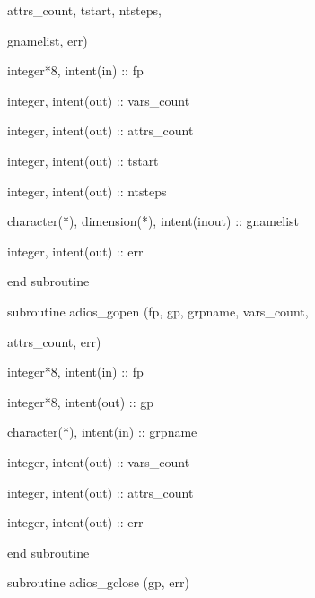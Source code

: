 \vspace{10pt}
\parindent=97pt
attrs\_count, tstart, ntsteps, 

\vspace{10pt}
gnamelist, err)

\vspace{10pt}
\parindent=36pt
integer*8,      intent(in)  :: fp

\vspace{10pt}
integer,        intent(out) :: vars\_count

\vspace{10pt}
integer,        intent(out) :: attrs\_count

\vspace{10pt}
integer,        intent(out) :: tstart

\vspace{10pt}
integer,        intent(out) :: ntsteps

\vspace{10pt}
character(*), dimension(*), intent(inout) :: gnamelist

\vspace{10pt}
integer,        intent(out) :: err

\vspace{10pt}
\parindent=0pt
end subroutine

\vspace{22pt}
subroutine adios\_gopen (fp, gp, grpname, vars\_count, 

\vspace{10pt}
\parindent=86pt
attrs\_count, err)

\vspace{10pt}
\parindent=36pt
integer*8,      intent(in)  :: fp

\vspace{10pt}
integer*8,      intent(out) :: gp

\vspace{10pt}
character(*),   intent(in)  :: grpname

\vspace{10pt}
integer,        intent(out) :: vars\_count

\vspace{10pt}
integer,        intent(out) :: attrs\_count

\vspace{10pt}
integer,        intent(out) :: err

\vspace{10pt}
\parindent=0pt
end subroutine

\vspace{22pt}
subroutine adios\_gclose (gp, err)


